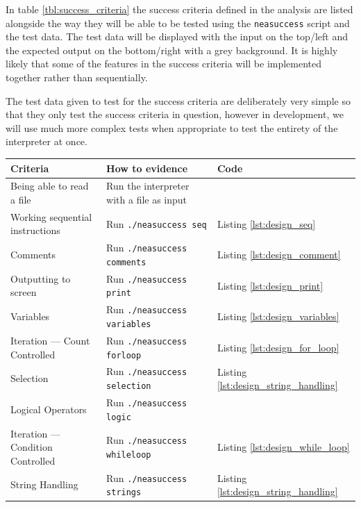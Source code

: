 \documentclass{article}
\begin{document}
In table \ref{tbl:success_criteria} the success criteria defined in the
analysis are listed alongside the way they will be able to be tested using the
\texttt{neasuccess} script and the test data. The test data will be displayed
with the input on the top/left and the expected output on the bottom/right with
a grey background. It is highly likely that some of the features in the success
criteria will be implemented together rather than sequentially.

The test data given to test for the success criteria are deliberately very
simple so that they only test the success criteria in question, however in
development, we will use much more complex tests when appropriate to test the
entirety of the interpreter at once.

\begin{table}
    \begin{adjustbox}{center}
        \begin{tabular}{|l|l|l|}
            \hline
			Criteria & How to evidence & Code \\
            \hline
            Being able to read a file & Run the interpreter with a file as input & \\
            \hline
			Working sequential instructions & Run \texttt{./neasuccess seq} & Listing \ref{lst:design_seq} \\
            \hline
			Comments & Run \texttt{./neasuccess comments} & Listing \ref{lst:design_comment} \\
            \hline
			Outputting to screen & Run \texttt{./neasuccess print} & Listing \ref{lst:design_print} \\
            \hline
			Variables & Run \texttt{./neasuccess variables} & Listing \ref{lst:design_variables} \\
            \hline
            Iteration --- Count Controlled & Run \texttt{./neasuccess forloop} & Listing \ref{lst:design_for_loop} \\
            \hline
			Selection & Run \texttt{./neasuccess selection} & Listing \ref{lst:design_string_handling} \\
            \hline
			Logical Operators & Run \texttt{./neasuccess logic} & \\
            \hline
            Iteration --- Condition Controlled & Run \texttt{./neasuccess whileloop} & Listing \ref{lst:design_while_loop} \\
            \hline
			String Handling & Run \texttt{./neasuccess strings} & Listing \ref{lst:design_string_handling} \\

\end{tabular}
\end{adjustbox}
\end{table}
\end{document}
